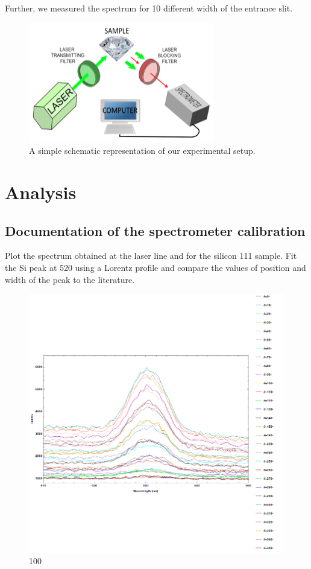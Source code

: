 \documentclass[openany,11pt,a4paper]{report}
\begin{document}
Further, we measured the spectrum for 10  different width of the
entrance slit.



\begin{figure}[hbtp]
\centering
\includegraphics[scale=1.3]{setup.PNG}
\caption{A simple schematic representation of our experimental setup. \cite{setup}}
\end{figure}




\chapter{Analysis}

\section{Documentation of the spectrometer calibration}



Plot the spectrum obtained at the laser line and for the silicon 111 sample.
Fit the Si peak at 520  using a Lorentz profile and compare the values of
position and width of the peak to the literature.




\begin{figure}[H]
\centering
\includegraphics[scale=0.84]{100collectives.PNG}
\caption{100}
\end{figure}
\end{document}

